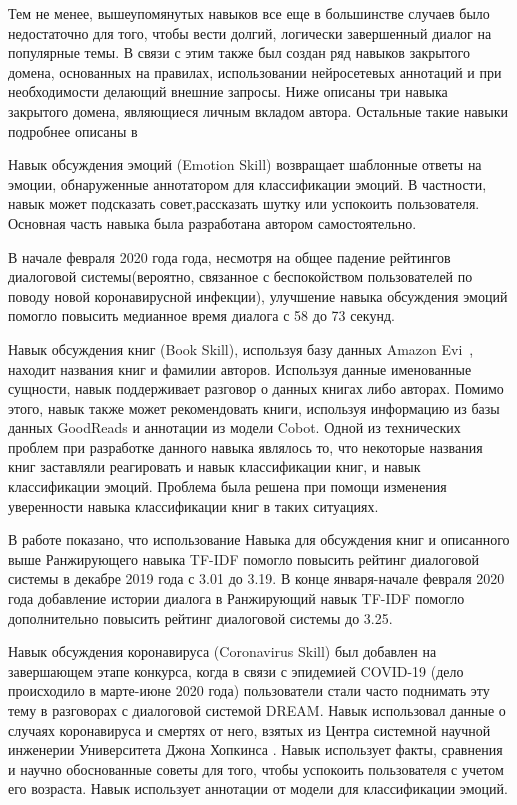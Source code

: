 Тем не менее, вышеупомянутых навыков все еще в большинстве случаев было недостаточно для того, чтобы вести долгий, логически завершенный диалог на популярные темы. В связи с этим также был создан ряд навыков закрытого домена, основанных на правилах, использовании нейросетевых аннотаций и при необходимости делающий внешние запросы. Ниже описаны три навыка закрытого домена, являющиеся личным вкладом автора. Остальные такие навыки подробнее описаны в~\cite{dream1,dream1_trudy}

Навык обсуждения эмоций (Emotion Skill) возвращает шаблонные ответы на эмоции, обнаруженные аннотатором для классификации эмоций. В частности, навык может подсказать совет,рассказать шутку или успокоить пользователя. Основная часть навыка была разработана автором самостоятельно.

В начале февраля 2020 года года, несмотря на общее падение рейтингов диалоговой системы(вероятно, связанное  с беспокойством пользователей по поводу новой коронавирусной инфекции), улучшение навыка обсуждения эмоций помогло повысить медианное время диалога с 58 до 73 секунд.

Навык обсуждения книг (Book Skill), используя базу данных Amazon Evi~\cite{na_website_nds}, находит названия книг и фамилии авторов. Используя данные именованные сущности, навык поддерживает разговор о данных книгах либо авторах. Помимо этого, навык также может рекомендовать книги, используя информацию из базы данных GoodReads \cite{na_website_ndt} и аннотации из модели Cobot. Одной из технических проблем при разработке данного навыка являлось то, что некоторые названия книг заставляли реагировать и навык классификации книг, и навык классификации эмоций. Проблема была решена при помощи изменения уверенности навыка классификации книг в таких ситуациях.

В работе \cite{dream1} показано, что использование Навыка для обсуждения книг и описанного выше Ранжирующего навыка TF-IDF помогло повысить рейтинг диалоговой системы в декабре 2019 года с 3.01 до 3.19.  В конце января-начале февраля 2020 года добавление истории диалога в Ранжирующий навык TF-IDF помогло дополнительно повысить рейтинг диалоговой системы до 3.25.

Навык обсуждения коронавируса (Coronavirus Skill) был добавлен на завершающем этапе конкурса, когда в связи с эпидемией COVID-19 (дело происходило в марте-июне 2020 года) пользователи стали часто поднимать эту тему в разговорах с диалоговой системой DREAM. Навык использовал данные о случаях коронавируса и смертях от него, взятых из Центра системной научной инженерии Университета Джона Хопкинса \cite{na_website_ndr}. Навык использует факты, сравнения и научно обоснованные советы для того, чтобы успокоить пользователя с учетом его возраста. Навык использует аннотации от модели для классификации эмоций.

